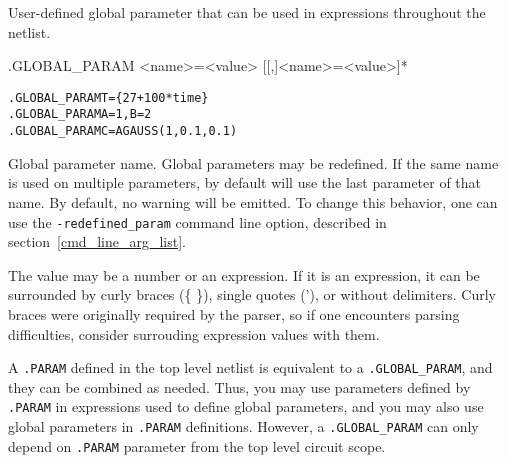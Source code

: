 

User-defined global parameter that can be used in expressions throughout the netlist.
\begin{Command}

\format
.GLOBAL\_PARAM <name>=<value> [[,]<name>=<value>]*

\examples
\begin{alltt}
.GLOBAL\_PARAM T=\{27+100*time\}
.GLOBAL\_PARAM A=1, B=2
.GLOBAL\_PARAM C=AGAUSS(1,0.1,0.1)
\end{alltt}

\arguments

\begin{Arguments}


Global parameter name.  Global parameters may be redefined.  
If the same name is used on multiple parameters, \Xyce{} by default will use the last parameter of that name.  
  By default, no warning will be emitted.
To change this behavior, one can use the \texttt{-redefined\_param} command line option, described in section~\ref{cmd_line_arg_list}.


The value may be a number or an expression.  If it is an expression, it can be surrounded 
by curly braces (\{ \}), single quotes ('), or without delimiters.  Curly braces were originally 
required by the \Xyce{} parser, so if one encounters parsing difficulties, consider 
surrouding expression values with them.

\end{Arguments}

\comments

A \texttt{.PARAM} 
defined in the top level netlist is equivalent to 
a \texttt{.GLOBAL\_PARAM}, and they can be combined as needed.
Thus, you may use parameters defined by \texttt{.PARAM} in expressions used to
define global parameters, and you may also use global parameters in
\texttt{.PARAM} definitions.    However, a \texttt{.GLOBAL\_PARAM} 
  can only depend on \texttt{.PARAM} parameter from the top level circuit scope.


\end{Command}
